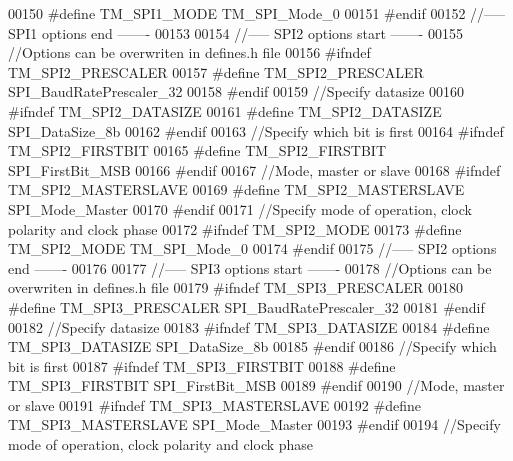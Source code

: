 \begin{DoxyCode}
00150 \textcolor{preprocessor}{#define TM\_SPI1\_MODE        TM\_SPI\_Mode\_0}
00151 \textcolor{preprocessor}{#endif}
00152 \textcolor{comment}{//----- SPI1 options end -------}
00153 
00154 \textcolor{comment}{//----- SPI2 options start -------}
00155 \textcolor{comment}{//Options can be overwriten in defines.h file}
00156 \textcolor{preprocessor}{#ifndef TM\_SPI2\_PRESCALER}
00157 \textcolor{preprocessor}{#define TM\_SPI2\_PRESCALER   SPI\_BaudRatePrescaler\_32}
00158 \textcolor{preprocessor}{#endif}
00159 \textcolor{comment}{//Specify datasize}
00160 \textcolor{preprocessor}{#ifndef TM\_SPI2\_DATASIZE}
00161 \textcolor{preprocessor}{#define TM\_SPI2\_DATASIZE    SPI\_DataSize\_8b}
00162 \textcolor{preprocessor}{#endif}
00163 \textcolor{comment}{//Specify which bit is first}
00164 \textcolor{preprocessor}{#ifndef TM\_SPI2\_FIRSTBIT}
00165 \textcolor{preprocessor}{#define TM\_SPI2\_FIRSTBIT    SPI\_FirstBit\_MSB}
00166 \textcolor{preprocessor}{#endif}
00167 \textcolor{comment}{//Mode, master or slave}
00168 \textcolor{preprocessor}{#ifndef TM\_SPI2\_MASTERSLAVE}
00169 \textcolor{preprocessor}{#define TM\_SPI2\_MASTERSLAVE SPI\_Mode\_Master}
00170 \textcolor{preprocessor}{#endif}
00171 \textcolor{comment}{//Specify mode of operation, clock polarity and clock phase}
00172 \textcolor{preprocessor}{#ifndef TM\_SPI2\_MODE}
00173 \textcolor{preprocessor}{#define TM\_SPI2\_MODE        TM\_SPI\_Mode\_0}
00174 \textcolor{preprocessor}{#endif}
00175 \textcolor{comment}{//----- SPI2 options end -------}
00176 
00177 \textcolor{comment}{//----- SPI3 options start -------}
00178 \textcolor{comment}{//Options can be overwriten in defines.h file}
00179 \textcolor{preprocessor}{#ifndef TM\_SPI3\_PRESCALER}
00180 \textcolor{preprocessor}{#define TM\_SPI3\_PRESCALER   SPI\_BaudRatePrescaler\_32}
00181 \textcolor{preprocessor}{#endif}
00182 \textcolor{comment}{//Specify datasize}
00183 \textcolor{preprocessor}{#ifndef TM\_SPI3\_DATASIZE}
00184 \textcolor{preprocessor}{#define TM\_SPI3\_DATASIZE    SPI\_DataSize\_8b}
00185 \textcolor{preprocessor}{#endif}
00186 \textcolor{comment}{//Specify which bit is first}
00187 \textcolor{preprocessor}{#ifndef TM\_SPI3\_FIRSTBIT}
00188 \textcolor{preprocessor}{#define TM\_SPI3\_FIRSTBIT    SPI\_FirstBit\_MSB}
00189 \textcolor{preprocessor}{#endif}
00190 \textcolor{comment}{//Mode, master or slave}
00191 \textcolor{preprocessor}{#ifndef TM\_SPI3\_MASTERSLAVE}
00192 \textcolor{preprocessor}{#define TM\_SPI3\_MASTERSLAVE SPI\_Mode\_Master}
00193 \textcolor{preprocessor}{#endif}
00194 \textcolor{comment}{//Specify mode of operation, clock polarity and clock phase}

\end{DoxyCode}
